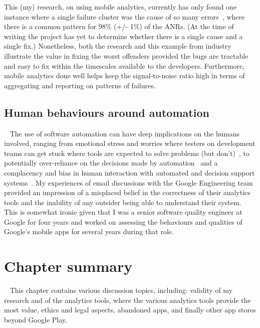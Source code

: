 This (my) research, on using mobile analytics, currently has only found one instance where a single failure cluster was the cause of so many errors~, where there is a common pattern for 98\% (+/- 1\%) of the ANRs. (At the time of writing the project has yet to determine whether there is a single cause and a single fix.) Nonetheless, both the research and this example from industry illustrate the value in fixing the worst offenders provided the bugs are tractable and easy to fix within the timescales available to the developers. Furthermore, mobile analytics done well helps keep the signal-to-noise ratio high in terms of aggregating and reporting on patterns of failures.


\subsection{Human behaviours around automation}~\label{discussion-human-behaviours-around-automation-topic}
The use of software automation can have deep implications on the humans involved, ranging from emotional stress and worries where testers on development teams can get stuck where tools are expected to solve problems (but don't)~\cite{evans2020stuck}, to potentially over-reliance on the decisions made by automation~\cite{cummings2004automation} and a complacency and bias in human interaction with automated and decision support systems~\cite{parasuraman_complacency_and_bias_in_human_use_of_automation}. 
My experiences of email discussions with the Google Engineering team provided an impression of a misplaced belief in the correctness of their analytics tools and the inability of any outsider being able to understand their system. %
This is somewhat ironic given that I was a senior software quality engineer at Google for four years and worked on assessing the behaviours and qualities of Google's mobile apps for several years during that role.



\section{Chapter summary}~\label{discussion-chapter-summary-section}
This chapter contains various discussion topics, including: validity of my research and of the analytics tools, where the various analytics tools provide the most value, ethics and legal aspects, abandoned apps, and finally other app stores beyond Google Play.

